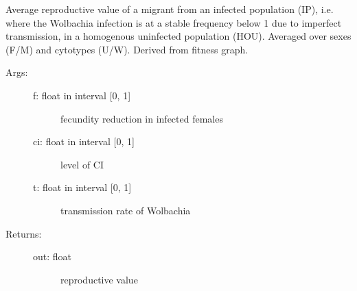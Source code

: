 \documentclass[letterpaper,10pt,english]{sphinxmanual}
\begin{document}
\begin{fulllineitems}
\label{index:wspec.analytical.reproval_IPHOMU}
Average reproductive value of a migrant from an infected 
population (IP), i.e. where the Wolbachia infection is at a stable 
frequency below 1 due to imperfect transmission, in a homogenous 
uninfected population (HOU). Averaged over sexes (F/M) and 
cytotypes (U/W). Derived from fitness graph.
\begin{description}
\item[{Args:}] \leavevmode\begin{description}
\item[{f: float in interval {[}0, 1{]}}] \leavevmode
fecundity reduction in infected females

\item[{ci: float in interval {[}0, 1{]}}] \leavevmode
level of CI

\item[{t: float in interval {[}0, 1{]}}] \leavevmode
transmission rate of Wolbachia

\end{description}

\item[{Returns:}] \leavevmode\begin{description}
\item[{out: float}] \leavevmode
reproductive value

\end{description}

\end{description}

\end{fulllineitems}

\end{document}
